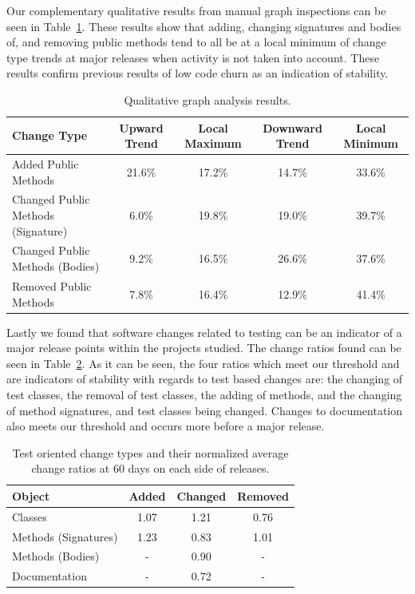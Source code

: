 \documentclass[conference]{IEEEtran}
\begin{document}
Our complementary qualitative results from manual graph inspections can be seen in Table~\ref{tab:qual}. These results show that adding, changing signatures
and bodies of, and removing public methods tend to all be at a local minimum of change type trends at major releases when activity is not taken into
account. These results confirm previous results of low code churn as an indication of stability.

\begin{table}[tb!]
\begin{center}
\begin{tabular}{| l | c | c | c | c |}
\hline
Change Type & Upward Trend & Local Maximum & Downward Trend & Local Minimum\\
\hline
Added Public Methods & 21.6\% & 17.2\% & 14.7\% & 33.6\% \\
Changed Public Methods (Signature) & 6.0\% & 19.8\% & 19.0\% & 39.7\% \\
Changed Public Methods (Bodies) & 9.2\% & 16.5\% & 26.6\% & 37.6\% \\
Removed Public Methods & 7.8\% & 16.4\% & 12.9\% & 41.4\% \\
\hline
\end{tabular}
\end{center}
\caption{Qualitative graph analysis results. \label{tab:qual}}
\end{table}

Lastly we found that software changes related to testing can be an indicator of a major release points within the projects studied. The change
ratios found can be seen in Table~\ref{tab:test}. As it can be seen, the four ratios which meet our threshold and are indicators of stability with regards to test based
changes are: the changing of test classes, the removal of test classes, the adding of methods, and the changing of method signatures, and test classes being changed.
Changes to documentation also meets our threshold and occurs more before a major release.

\begin{table}[h]
\begin{center}
\begin{tabular}{| l | c | c | c |}
\hline
Object & Added & Changed & Removed\\
\hline
Classes & 1.07 & 1.21 & 0.76 \\
Methods (Signatures) & 1.23 & 0.83 & 1.01 \\
Methods (Bodies) & - & 0.90 & - \\
Documentation & - & 0.72 & - \\
\hline
\end{tabular}
\end{center}
\caption{Test oriented change types and their normalized average change ratios at 60 days on each side of releases. \label{tab:test}}
\end{table}
\end{document}
